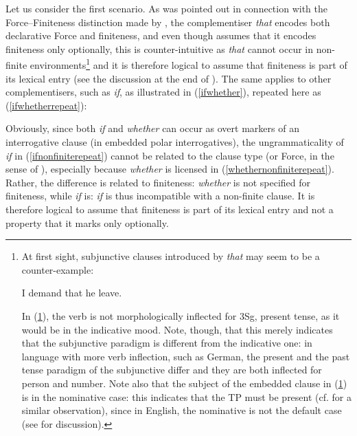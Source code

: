 Let us consider the first scenario. As was pointed out in connection with the Force--Finiteness distinction made by \citet{rizzi1997}, the complementiser \textit{that} encodes both declarative Force and finiteness, and even though \citet{rizzi1997} assumes that it encodes finiteness only optionally, this is counter-intuitive as \textit{that} cannot occur in non-finite environments\footnote{At first sight, subjunctive clauses introduced by \textit{that} may seem to be a counter-example:

\ea I demand that he leave. \label{demand}
\z

In (\ref{demand}), the verb is not morphologically inflected for 3Sg, present tense, as it would be in the indicative mood. Note, though, that this merely indicates that the subjunctive paradigm is different from the indicative one: in language with more verb inflection, such as German, the present and the past tense paradigm of the subjunctive differ and they are both inflected for person and number. Note also that the subject of the embedded clause in (\ref{demand}) is in the nominative case: this indicates that the TP must be present (cf. \citealt[86--87]{kannonomura2012} for a similar observation), since in English, the nominative is not the default case (see  for discussion).} and it is therefore logical to assume that finiteness is part of its lexical entry (see the discussion at the end of ). The same applies to other complementisers, such as \textit{if}, as illustrated in (\ref{ifwhether}), repeated here as (\ref{ifwhetherrepeat}):

\ea \label{ifwhetherrepeat}
\z
\z

Obviously, since both \textit{if} and \textit{whether} can occur as overt markers of an interrogative clause (in embedded polar interrogatives), the ungrammaticality of \textit{if} in (\ref{ifnonfiniterepeat}) cannot be related to the clause type (or Force, in the sense of \citealt{rizzi1997}), especially because \textit{whether} is licensed in (\ref{whethernonfiniterepeat}). Rather, the difference is related to finiteness: \textit{whether} is not specified for finiteness, while \textit{if} is: \textit{if} is thus incompatible with a non-finite clause. It is therefore logical to assume that finiteness is part of its lexical entry and not a property that it marks only optionally.

